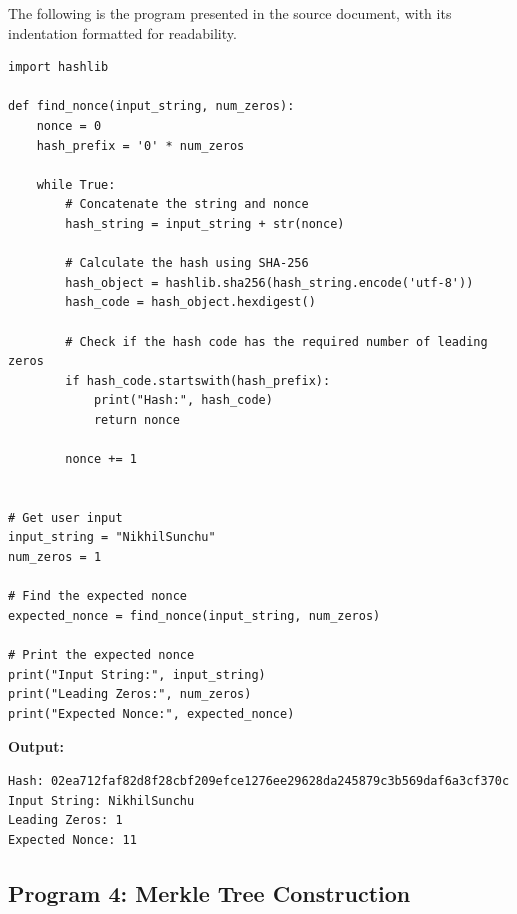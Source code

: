 \documentclass[12pt,a4paper]{article}
\begin{document}
The following is the program presented in the source document, with its indentation formatted for readability.

\begin{lstlisting}[style=pythonstyle]
import hashlib

def find_nonce(input_string, num_zeros):
    nonce = 0
    hash_prefix = '0' * num_zeros

    while True:
        # Concatenate the string and nonce
        hash_string = input_string + str(nonce)

        # Calculate the hash using SHA-256
        hash_object = hashlib.sha256(hash_string.encode('utf-8'))
        hash_code = hash_object.hexdigest()

        # Check if the hash code has the required number of leading zeros
        if hash_code.startswith(hash_prefix):
            print("Hash:", hash_code)
            return nonce

        nonce += 1


# Get user input
input_string = "NikhilSunchu"
num_zeros = 1

# Find the expected nonce
expected_nonce = find_nonce(input_string, num_zeros)

# Print the expected nonce
print("Input String:", input_string)
print("Leading Zeros:", num_zeros)
print("Expected Nonce:", expected_nonce)
\end{lstlisting}

\textbf{Output:}
\begin{lstlisting}[style=outputstyle]
Hash: 02ea712faf82d8f28cbf209efce1276ee29628da245879c3b569daf6a3cf370c
Input String: NikhilSunchu
Leading Zeros: 1
Expected Nonce: 11
\end{lstlisting}

\subsection{Program 4: Merkle Tree Construction}
\end{document}
